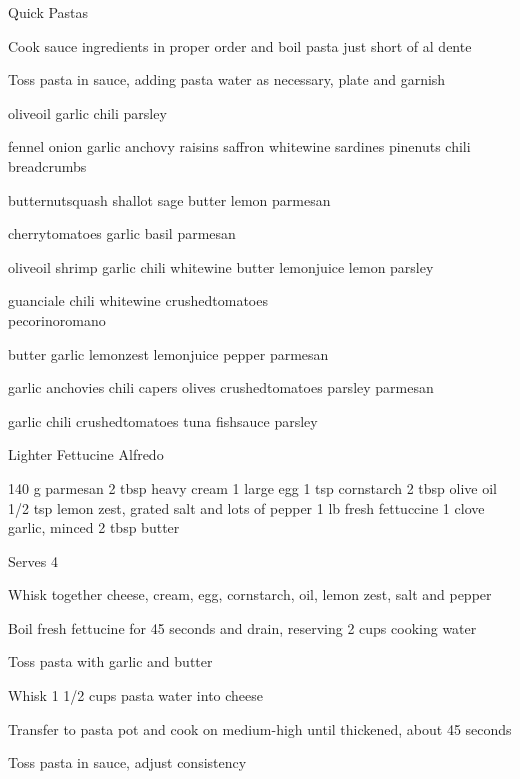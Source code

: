 
\begin{densecard}{Quick Pastas}{}
\begin{steps}
    \item Cook sauce ingredients in proper order and boil pasta just short of al dente
    \item Toss pasta in sauce, adding pasta water as necessary, plate and garnish
\end{steps}
\begin{paracol}{3}
 olive\ijoin{}oil garlic chili parsley

 fennel onion garlic anchovy raisins saffron white\ijoin{}wine sardines pine\ijoin{}nuts chili breadcrumbs

 butternut\ijoin{}squash shallot sage butter lemon parmesan

\nextcolumn
{} cherry\ijoin{}tomatoes garlic basil parmesan

 olive\ijoin{}oil shrimp garlic chili white\ijoin{}wine butter lemon\ijoin{}juice lemon parsley

 guanciale chili white\ijoin{}wine crushed\ijoin{}tomatoes\\pecorino\ijoin{}romano

\nextcolumn
{} butter garlic lemon\ijoin{}zest lemon\ijoin{}juice pepper parmesan

 garlic anchovies chili capers olives crushed\ijoin{}tomatoes parsley parmesan

 garlic chili crushed\ijoin{}tomatoes tuna fish\ijoin{}sauce parsley
\end{paracol}
\end{densecard}

\begin{recipe}{Lighter Fettucine Alfredo}{\vegetarian{}}
\begin{ingredients}
140 g parmesan
2 tbsp heavy cream
1 large egg
1 tsp cornstarch
2 tbsp olive oil
1/2 tsp lemon zest, grated
salt and lots of pepper
1 lb fresh fettuccine
1 clove garlic, minced
2 tbsp butter
\end{ingredients}
\nextcolumn
Serves 4
\begin{steps}
    \item Whisk together cheese, cream, egg, cornstarch, oil, lemon zest, salt and pepper
    \item Boil fresh fettucine for 45 seconds and drain, reserving 2 cups cooking water
    \item Toss pasta with garlic and butter
    \item Whisk 1 1/2 cups pasta water into cheese
    \item Transfer to pasta pot and cook on medium-high until thickened, about 45 seconds
    \item Toss pasta in sauce, adjust consistency
\end{steps}
\end{recipe}

